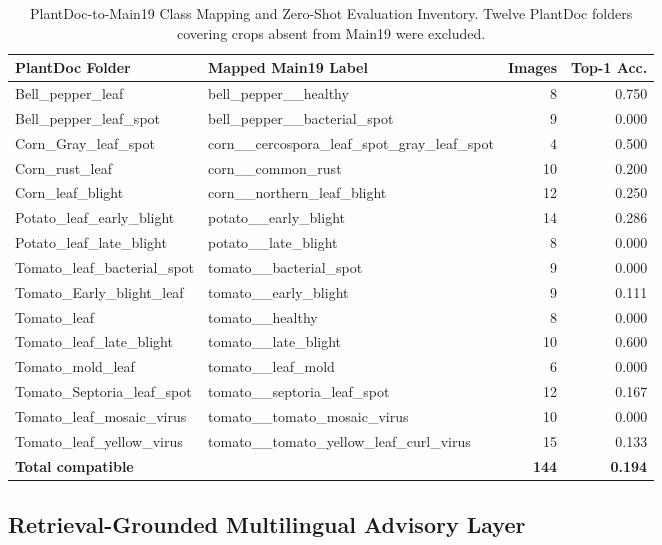 \documentclass[conference]{IEEEtran}
\begin{document}
\begin{table}[t]
\caption{PlantDoc-to-Main19 Class Mapping and Zero-Shot Evaluation Inventory.
Twelve PlantDoc folders covering crops absent from Main19 were excluded.}
\label{tab:plantdoc_mapping}
\centering
\begin{tabular}{llrr}
\toprule
\textbf{PlantDoc Folder} & \textbf{Mapped Main19 Label} & \textbf{Images} & \textbf{Top-1 Acc.} \\
\midrule
Bell\_pepper\_leaf & bell\_pepper\_\_healthy & 8 & 0.750 \\
Bell\_pepper\_leaf\_spot & bell\_pepper\_\_bacterial\_spot & 9 & 0.000 \\
Corn\_Gray\_leaf\_spot & corn\_\_cercospora\_leaf\_spot\_gray\_leaf\_spot & 4 & 0.500 \\
Corn\_rust\_leaf & corn\_\_common\_rust & 10 & 0.200 \\
Corn\_leaf\_blight & corn\_\_northern\_leaf\_blight & 12 & 0.250 \\
Potato\_leaf\_early\_blight & potato\_\_early\_blight & 14 & 0.286 \\
Potato\_leaf\_late\_blight & potato\_\_late\_blight & 8 & 0.000 \\
Tomato\_leaf\_bacterial\_spot & tomato\_\_bacterial\_spot & 9 & 0.000 \\
Tomato\_Early\_blight\_leaf & tomato\_\_early\_blight & 9 & 0.111 \\
Tomato\_leaf & tomato\_\_healthy & 8 & 0.000 \\
Tomato\_leaf\_late\_blight & tomato\_\_late\_blight & 10 & 0.600 \\
Tomato\_mold\_leaf & tomato\_\_leaf\_mold & 6 & 0.000 \\
Tomato\_Septoria\_leaf\_spot & tomato\_\_septoria\_leaf\_spot & 12 & 0.167 \\
Tomato\_leaf\_mosaic\_virus & tomato\_\_tomato\_mosaic\_virus & 10 & 0.000 \\
Tomato\_leaf\_yellow\_virus & tomato\_\_tomato\_yellow\_leaf\_curl\_virus & 15 & 0.133 \\
\midrule
\multicolumn{2}{l}{\textbf{Total compatible}} & \textbf{144} & \textbf{0.194} \\
\bottomrule
\end{tabular}
\end{table}

\subsection{Retrieval-Grounded Multilingual Advisory Layer}
\end{document}
